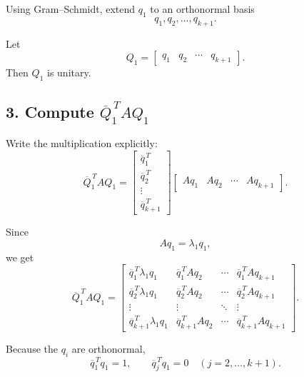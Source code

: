 \documentclass[12pt,a4paper]{article}
\begin{document}
Using Gram--Schmidt, extend $q_1$ to an orthonormal basis
\[
    q_1,q_2,\ldots,q_{k+1}.
\]

Let
\[
    Q_1=
    \left[
        \begin{array}{cccc}
            q_1 & q_2 & \cdots & q_{k+1}
        \end{array}
        \right].
\]
Then $Q_1$ is unitary.

\subsection*{3. Compute $\overline{Q}_1^{\,T}AQ_1$}

Write the multiplication explicitly:
\[
    \overline{Q}_1^{\,T}AQ_1
    =
    \left[
        \begin{array}{c}
            \overline{q}_1^{\,T} \\[3pt]
            \overline{q}_2^{\,T} \\[3pt]
            \vdots               \\[3pt]
            \overline{q}_{k+1}^{\,T}
        \end{array}
        \right]
    \left[
        \begin{array}{cccc}
            Aq_1 & Aq_2 & \cdots & Aq_{k+1}
        \end{array}
        \right].
\]

Since
\[
    Aq_1=\lambda_1q_1,
\]
we get
\[
    \overline{Q}_1^{\,T}AQ_1
    =
    \left[
        \begin{array}{cccc}
            \overline{q}_1^{\,T}\lambda_1q_1     &
            \overline{q}_1^{\,T}Aq_2             &
            \cdots                               &
            \overline{q}_1^{\,T}Aq_{k+1}
            \\[5pt]
            \overline{q}_2^{\,T}\lambda_1q_1     &
            \overline{q}_2^{\,T}Aq_2             &
            \cdots                               &
            \overline{q}_2^{\,T}Aq_{k+1}
            \\[5pt]
            \vdots                               & \vdots & \ddots & \vdots
            \\[5pt]
            \overline{q}_{k+1}^{\,T}\lambda_1q_1 &
            \overline{q}_{k+1}^{\,T}Aq_2         &
            \cdots                               &
            \overline{q}_{k+1}^{\,T}Aq_{k+1}
        \end{array}
        \right].
\]

Because the $q_i$ are orthonormal,
\[
    \overline{q}_1^{\,T}q_1=1,
    \qquad
    \overline{q}_j^{\,T}q_1=0
    \quad(j=2,\ldots,k+1).
\]
\end{document}

